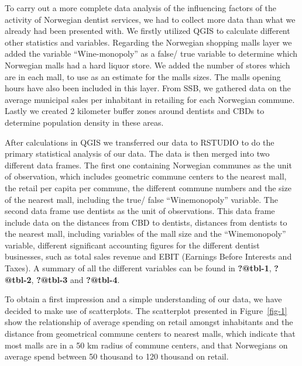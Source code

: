 \documentclass[
  10,
  a4paper,
]{article}
\begin{document}
To carry out a more complete data analysis of the influencing factors of
the activity of Norwegian dentist services, we had to collect more data
than what we already had been presented with. We firstly utilized QGIS
to calculate different other statistics and variables. Regarding the
Norwegian shopping malls layer we added the variable ``Wine-monopoly''
as a false/ true variable to determine which Norwegian malls had a hard
liquor store. We added the number of stores which are in each mall, to
use as an estimate for the malls sizes. The malls opening hours have
also been included in this layer. From SSB, we gathered data on the
average municipal sales per inhabitant in retailing for each Norwegian
commune. Lastly we created 2 kilometer buffer zones around dentists and
CBDs to determine population density in these areas.

After calculations in QGIS we transferred our data to RSTUDIO to do the
primary statistical analysis of our data. The data is then merged into
two different data frames. The first one containing Norwegian communes
as the unit of observation, which includes geometric commune centers to
the nearest mall, the retail per capita per commune, the different
commune numbers and the size of the nearest mall, including the true/
false ``Winemonopoly'' variable. The second data frame use dentists as
the unit of observations. This data frame include data on the distances
from CBD to dentists, distances from dentists to the nearest mall,
including variables of the mall size and the ``Winemonopoly'' variable,
different significant accounting figures for the different dentist
businesses, such as total sales revenue and EBIT (Earnings Before
Interests and Taxes). A summary of all the different variables can be
found in \textbf{?@tbl-1}, \textbf{?@tbl-2}, \textbf{?@tbl-3} and
\textbf{?@tbl-4}.

To obtain a first impression and a simple understanding of our data, we
have decided to make use of scatterplots. The scatterplot presented in
Figure~\ref{fig-1} show the relationship of average spending on retail
amongst inhabitants and the distance from geometrical commune centers to
nearest malls, which indicate that most malls are in a 50 km radius of
commune centers, and that Norwegians on average spend between 50
thousand to 120 thousand on retail.
\end{document}
